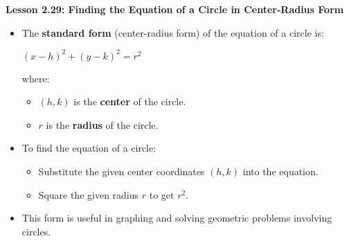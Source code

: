 \begin{center}
\textbf{Lesson 2.29: Finding the Equation of a Circle in Center-Radius Form}
\end{center}

\vspace*{-1.5ex}

\begin{itemize}
    \item The \textbf{standard form} (center-radius form) of the equation of a circle is:

{\centering $
    (x - h)^2 + (y - k)^2 = r^2
$\par}
    where:
    \begin{itemize}
        \item $(h, k)$ is the \textbf{center} of the circle.
        \item $r$ is the \textbf{radius} of the circle.
    \end{itemize}
    \item To find the equation of a circle:
    \begin{itemize}
        \item Substitute the given center coordinates $(h, k)$ into the equation.
        \item Square the given radius $r$ to get $r^2$.
    \end{itemize}
    \item This form is useful in graphing and solving geometric problems involving circles.
\end{itemize}
